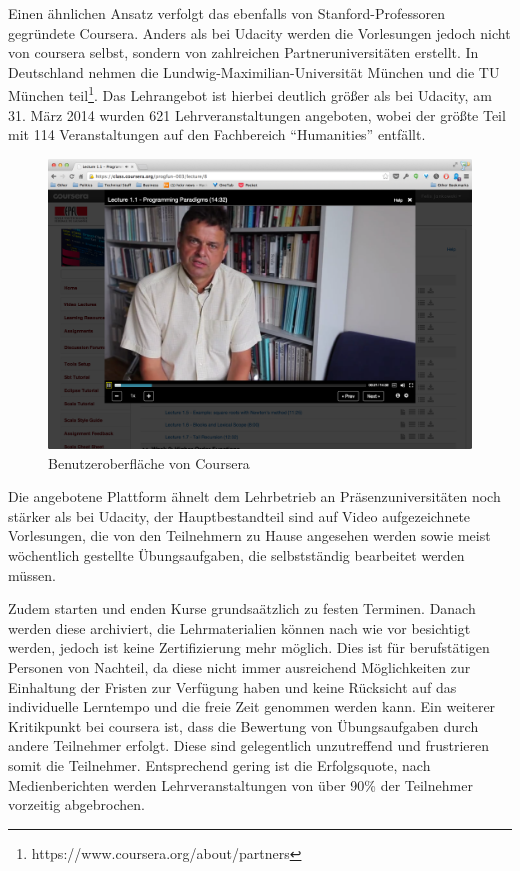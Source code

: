 			Einen ähnlichen Ansatz verfolgt das ebenfalls von Stanford-Professoren gegründete Coursera.
			Anders als bei Udacity werden die Vorlesungen jedoch nicht von coursera selbst, sondern von zahlreichen Partneruniversitäten erstellt.
			In Deutschland nehmen die Lundwig-Maximilian-Universität München und die TU München teil\footnote{https://www.coursera.org/about/partners}. 
			Das Lehrangebot ist hierbei deutlich größer als bei Udacity, am 31. März 2014 wurden 621 Lehrveranstaltungen angeboten, wobei der größte Teil mit 114 Veranstaltungen auf den Fachbereich "`Humanities"' entfällt.


			\begin{figure}[h]
				\begin{center}
					\includegraphics[width=\textwidth]{img/coursera}
					\caption{Benutzeroberfläche von Coursera}
					\label{fig:screenshot-coursera}
				\end{center}
			\end{figure}


			Die angebotene Plattform ähnelt dem Lehrbetrieb an Präsenzuniversitäten noch stärker als bei Udacity, der Hauptbestandteil sind  auf Video aufgezeichnete Vorlesungen, die von den Teilnehmern zu Hause angesehen werden sowie meist wöchentlich gestellte Übungsaufgaben, die selbstständig bearbeitet werden müssen.

			Zudem starten und enden Kurse grundsaätzlich zu festen Terminen.
			Danach werden diese archiviert, die Lehrmaterialien können nach wie vor besichtigt werden, jedoch ist keine Zertifizierung mehr möglich.
			Dies ist für berufstätigen Personen von Nachteil, da diese nicht immer ausreichend Möglichkeiten zur Einhaltung der Fristen zur Verfügung haben und keine Rücksicht auf das individuelle Lerntempo und die freie Zeit genommen werden kann.
			Ein weiterer Kritikpunkt bei coursera ist, dass die Bewertung von Übungsaufgaben durch andere Teilnehmer erfolgt.
			Diese sind gelegentlich unzutreffend und frustrieren somit die Teilnehmer.
			Entsprechend gering ist die Erfolgsquote, nach Medienberichten werden Lehrveranstaltungen von über 90\% der Teilnehmer vorzeitig abgebrochen. 


